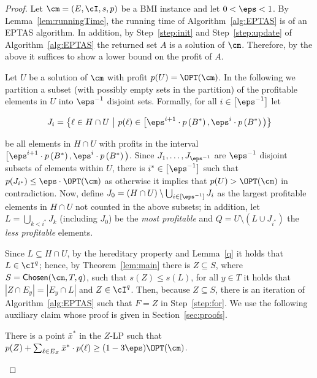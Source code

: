 \begin{proof}
	Let $\cm =  (E,\cI,s,p)$ be a BMI instance and let $0<\eps<1$. By Lemma~\ref{lem:runningTime}, the running time of Algorithm~\ref{alg:EPTAS} is of an EPTAS algorithm. In addition, by Step~\ref{step:init} and Step~\ref{step:update} of Algorithm~\ref{alg:EPTAS} the returned set $A$ is a solution of $\cm$. Therefore, by the above it suffices to show a lower bound on the profit of $A$. 
	
	Let $U$ be a solution of $\cm$ with profit $p(U) = \OPT(\cm)$. In the following we partition a subset (with possibly empty sets in the partition) of the profitable elements in $U$ into $\eps^{-1}$ disjoint sets. Formally, for all $i \in \left[\eps^{-1}\right]$ let 
	
	\begin{equation}
		\label{J_i}
J_i = \big\{\ell \in H \cap U~\big|~ p(\ell) \in \big[\eps^{i+1} \cdot p\left(B^*\right), \eps^{i} \cdot p\left(B^*\right) \big) \big\}		
	\end{equation}
	
 be all elements in $H \cap U$ with profits in the interval $\big[\eps^{i+1} \cdot p\left(B^*\right), \eps^{i} \cdot p\left(B^*\right) \big) $. Since $J_1,\ldots, J_{\eps^{-1}}$ are $\eps^{-1}$ disjoint  subsets of elements within $U$, there is $i^* \in \left[\eps^{-1}\right]$ such that $p(J_{i^*}) \leq \eps \cdot \OPT(\cm)$ as otherwise it implies that $p(U) > \OPT(\cm)$ in contradiction. Now, define $J_0 = (H \cap U) \setminus \bigcup_{i \in [\eps^{-1}]} J_i$ as the largest profitable elements in $H \cap U$ not counted in the above subsets; in addition, let $L =  \bigcup_{k < i^*} J_k$ (including $J_0$) be the {\em most profitable} and $Q = U \setminus (L \cup J_{i^*})$ the {\em less profitable} elements. 
 
 Since $L \subseteq H \cap U$, by the hereditary property and Lemma~\ref{q} it holds that $L \in \cI^q$; hence, by Theorem~\ref{lem:main} there is $Z \subseteq S$, where $S = \textsf{Chosen}(\cm,T,q)$, such that $s(Z) \leq s(L)$, for all $ y \in T$ it holds that $|Z \cap E_y| = |E_y \cap L|$ and $Z \in \cI^q$.  Then, because $Z \subseteq S$, there is an iteration of Algorithm~\ref{alg:EPTAS} such that $F = Z$ in Step~\ref{step:for}. We use the following auxiliary claim whose proof is given in Section~\ref{sec:proofs}.
	
	\begin{claim}
		\label{claim:x}
		There is a point $\bar{x}^*$ in the $Z$-LP such that $p(Z)+\sum_{\ell \in E_Z} \bar{x}^* \cdot p(\ell) \geq (1-3 \eps) \OPT(\cm)$.
	\end{claim}



\end{proof}
